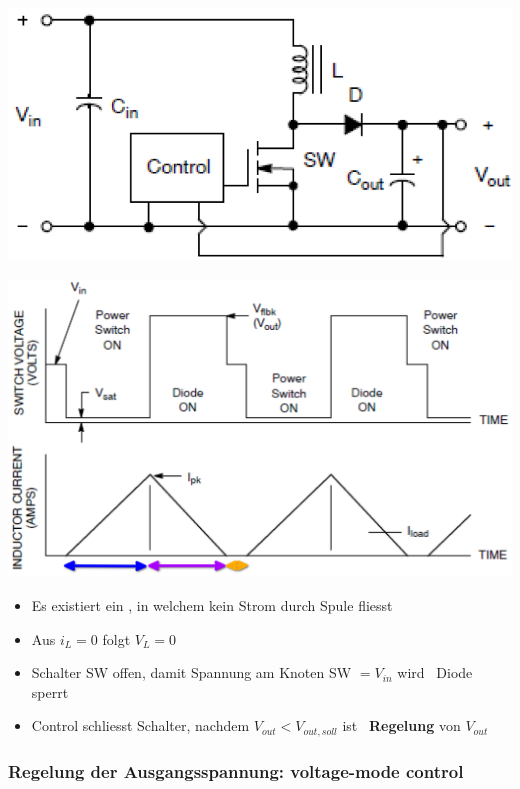 \begin{minipage}{0.42\columnwidth}
    \includegraphics[width=\columnwidth]{images/boost_lueckend.png}
\end{minipage}
\hfill
\begin{minipage}{0.5\columnwidth}
    \includegraphics[width=\columnwidth]{images/boost_lueckend_timing.png}
\end{minipage}

\begin{itemize}
    \item Es existiert ein , in welchem kein Strom durch Spule fliesst
    \item Aus $i_L = 0$ folgt $V_L = 0$
    \item Schalter SW offen, damit Spannung am Knoten SW $= V_{in}$ wird \textrightarrow\ Diode sperrt
    \item Control schliesst Schalter, nachdem $V_{out} < V_{out,soll}$ ist \textrightarrow\ \textbf{Regelung} von $V_{out}$
\end{itemize}


\subsubsection{Regelung der Ausgangsspannung: voltage-mode control}

